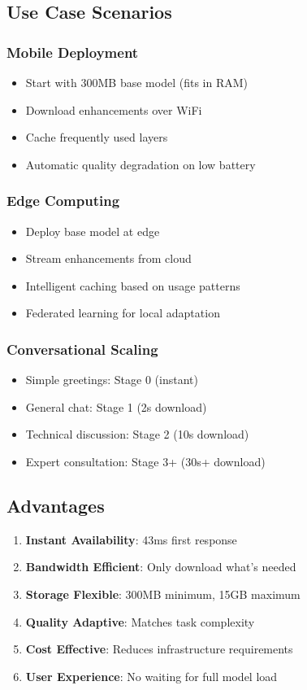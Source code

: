 \subsection{Use Case Scenarios}

\subsubsection{Mobile Deployment}
\begin{itemize}
    \item Start with 300MB base model (fits in RAM)
    \item Download enhancements over WiFi
    \item Cache frequently used layers
    \item Automatic quality degradation on low battery
\end{itemize}

\subsubsection{Edge Computing}
\begin{itemize}
    \item Deploy base model at edge
    \item Stream enhancements from cloud
    \item Intelligent caching based on usage patterns
    \item Federated learning for local adaptation
\end{itemize}

\subsubsection{Conversational Scaling}
\begin{itemize}
    \item Simple greetings: Stage 0 (instant)
    \item General chat: Stage 1 (2s download)
    \item Technical discussion: Stage 2 (10s download)  
    \item Expert consultation: Stage 3+ (30s+ download)
\end{itemize}

\subsection{Advantages}

\begin{enumerate}
    \item \textbf{Instant Availability}: 43ms first response
    \item \textbf{Bandwidth Efficient}: Only download what's needed
    \item \textbf{Storage Flexible}: 300MB minimum, 15GB maximum
    \item \textbf{Quality Adaptive}: Matches task complexity
    \item \textbf{Cost Effective}: Reduces infrastructure requirements
    \item \textbf{User Experience}: No waiting for full model load
\end{enumerate}

